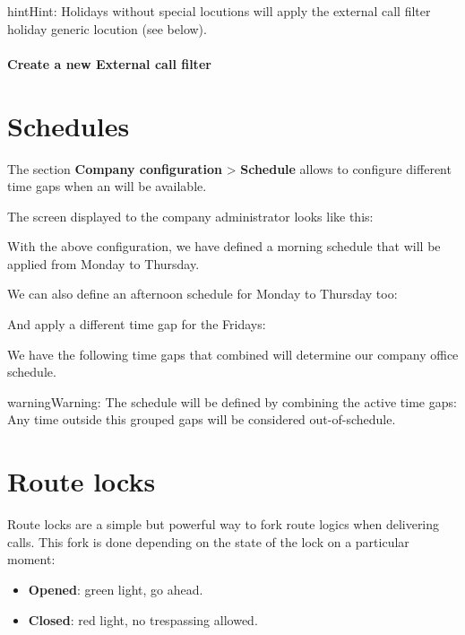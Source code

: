 \documentclass[letterpaper,10pt,english]{sphinxmanual}
\begin{document}
\begin{notice}{hint}{Hint:}
Holidays without special locutions will apply the external call filter
holiday generic locution (see below).
\end{notice}
\paragraph{Create a new External call filter}


\section{Schedules}
\label{company/schedules::doc}\label{company/schedules:schedules}
The section \textbf{Company configuration} \textgreater{} \textbf{Schedule} allows to configure
different time gaps when an {\hyperref[company/ddis:ddis]{}} will be available.

The screen displayed to the company administrator looks like this:

\noindent{}

With the above configuration, we have defined a morning schedule that will be
applied from Monday to Thursday.

We can also define an afternoon schedule for Monday to Thursday too:

\noindent{}

And apply a different time gap for the Fridays:

\noindent{}

We have the following time gaps that combined will determine our company
office schedule.

\noindent{}

\begin{notice}{warning}{Warning:}
The schedule will be defined by combining the active time gaps:
Any time outside this grouped gaps will be considered out-of-schedule.
\end{notice}


\section{Route locks}
\label{company/route_locks:id1}\label{company/route_locks::doc}\label{company/route_locks:route-locks}
Route locks are a simple but powerful way to fork route logics when delivering calls. This fork is done depending on the
state of the lock on a particular moment:
\begin{itemize}
\item {} 
\textbf{Opened}: green light, go ahead.

\item {} 
\textbf{Closed}: red light, no trespassing allowed.

\end{itemize}
\end{document}
